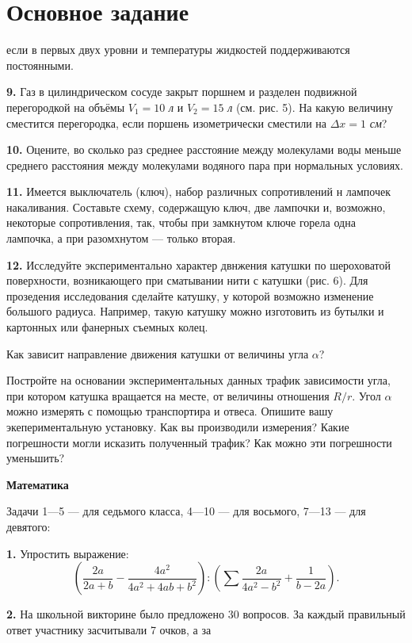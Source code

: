 \documentclass[../main.tex]{subfiles}
\begin{document}
\fontsize{11pt}{10pt}\selectfont
\setlength{\parindent}{1cm}
\section{Основное задание}
\begin{multicols}{2}
\noindent если в первых двух уровни и температуры жидкостей поддерживаются постоянными.
\par \textbf{9.} Газ в цилиндрическом сосуде закрыт поршнем и разделен подвижной перегородкой на объёмы $V_1=10$ \textit{л} и $V_2=15$ \textit{л} (см. рис. 5). На какую величину сместится перегородка, если поршень изометрически сместили на $\Delta x=1$ \textit{см}?
\par \textbf{10.} Оцените, во сколько раз среднее расстояние между молекулами воды меньше среднего расстояния между молекулами водяного пара при нормальных условиях.
\par \textbf{11.}  Имеется выключатель (ключ), набор различных сопротивлений н лампочек накаливания. Составьте схему, содержащую ключ, две лампочки и, возможно, некоторые сопротивления, так, чтобы при замкнутом ключе горела одна лампочка, а при разомхнутом — только вторая.
\par \textbf{12.} Исследуйте экспериментально характер двнжения катушки по шероховатой поверхности, возникающего при сматывании нити с катушки (рис. 6). Для прозедения исследования сделайте катушку, у которой возможно изменение большого радиуса. Например, такую катушку можно изготовить из бутылки и картонных или фанерных съемных колец. \par Как зависит направление движения катушки от величины угла $\alpha$?
\par
Постройте на основании экспериментальных данных трафик зависимости угла, при котором катушка вращается на месте, от величины отношения $R/r$. Угол $\alpha$ можно измерять с помощью транспортира и отвеса. Опишите вашу экепериментальную установку. Как вы производили измерения? Какие погрешности могли исказить полученный трафик? Как можно эти погрешности уменьшить?
\par\noindent\textbf{Математика}
\par Задачи 1—5 — для седьмого класса, 4—10 — для восьмого, 7—13 — для девятого:
\par \textbf{1. } Упростить выражение:
$$
\left(\frac{2a}{2a+b}-\frac{4a^2}{4a^2+4ab+b^2}\right):
\left(\sum{\frac{2a}{4a^2-b^2}}+\frac{1}{b-2a}\right).
$$
\par \textbf{2. } На школьной викторине было предложено 30 вопросов. За каждый правильный ответ участнику засчитывали 7 очков, а за \\

\end{multicols}
\end{document}
